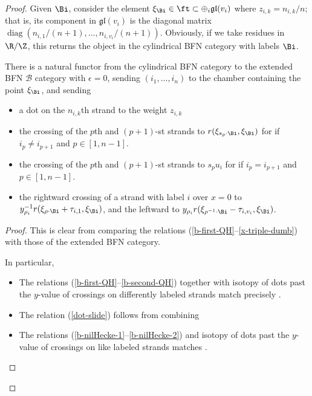 \begin{proof}
Given $\Bi$, consider the element $\xi_{\Bi}\in \ft\subset \oplus_i \mathfrak{gl}(v_i)$ where $z_{i,k}=n_{i,k}/n$; that is, its component in $\mathfrak{gl}(v_i)$ is the diagonal matrix $\operatorname{diag}(n_{i,1}/(n+1),\dots, n_{i,v_i}/(n+1))$.  Obviously, if we take residues in $\R/\Z$, this returns the object in the cylindrical BFN category with labels $\Bi$.

\begin{proposition}
  There is a natural functor from the cylindrical BFN category 
to the extended BFN
  $\mathscr{B}$ category with $\epsilon=0$, sending $(i_1,\dots, i_n)$ to the chamber  containing
  the point $\xi_{\Bi}$, and sending
  \begin{itemize}
  \item a dot on the $n_{i,k}$th strand to the weight $z_{i,k}$
  \item the crossing of the $p$th and $(p+1)$-st strands to
    $r(\xi_{s_p\cdot \Bi},\xi_{\Bi})$ for if $i_p\neq i_{p+1}$ and
    $p\in [1,n-1]$.
\item the crossing of the $p$th and $(p+1)$-st strands to
    $s_pu_i$ for if $i_p= i_{p+1}$ and $p\in [1,n-1]$.
\item the rightward crossing of a strand with label $i$ over $x=0$ to
  $y_{\rho_i}^{-1}r(\xi_{\rho\cdot \Bi}+\tau_{i,1},\xi_{\Bi})$, and the
  leftward to $y_{\rho_i}r(\xi_{\rho^{-1}\cdot \Bi}-\tau_{i,v_i},\xi_{\Bi})$.
  \end{itemize}
\end{proposition}



\begin{proof}
  This is clear from comparing the relations
  (\ref{b-first-QH}--\ref{x-triple-dumb}) with those of the extended
  BFN category.
  
  In particular, \begin{itemize}
      \item The relations (\ref{b-first-QH}--\ref{b-second-QH}) together with isotopy of dots past the $y$-value of crossings on differently labeled strands match precisely \cite[(3.1e)]{WebSD}.
            \item The relation (\ref{dot-slide}) follows from combining \cite[(3.1e)\& (3.2c)]{WebSD} 
      \item  The relations (\ref{b-nilHecke-1}--\ref{b-nilHecke-2}) and isotopy of dots past the $y$-value of crossings on like labeled strands matches \cite[(3.4d)]{WebSD}.


\end{itemize}
\end{proof}
\end{proof}
